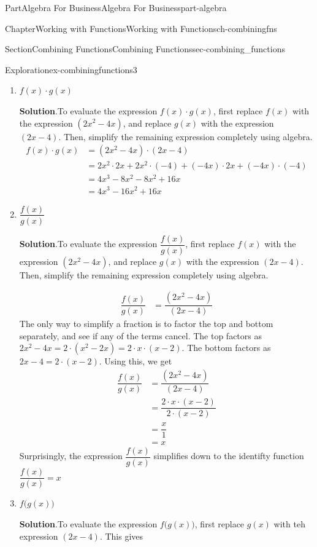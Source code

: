 \documentclass[oneside,10pt,]{tufte-book}
\newcommand{\blocktitlefont}{\relax}
\numberwithin{equation}{chapter}
\newcommand{\amp}{&}
\begin{document}
\begin{partptx}{Part}{Algebra For Business}{}{Algebra For Business}{}{}{part-algebra}
\begin{chapterptx}{Chapter}{Working with Functions}{}{Working with Functions}{}{}{ch-combiningfns}
\begin{sectionptx}{Section}{Combining Functions}{}{Combining Functions}{}{}{sec-combining_functions}
\begin{exploration}{Exploration}{}{ex-combiningfunctions3}
\begin{enumerate}[font=\bfseries,label=(\alph*),ref=\alph*]
\item{}\(f(x)\cdot g(x)\)%
\par\smallskip%
\noindent\textbf{\blocktitlefont Solution}.\hypertarget{ex-combiningfunctions3-4-2}{}\quad{}To evaluate the expression \(f(x)\cdot g(x)\), first replace \(f(x)\) with the expression \((2x^2-4x)\), and replace \(g(x)\) with the expression \((2x-4)\).  Then, simplify the remaining expression completely using algebra.%
\begin{align*}
f(x)\cdot g(x)\amp =(2x^2-4x) \cdot (2x-4)\\
\amp = 2x^2\cdot 2x + 2x^2 \cdot (-4) + (-4x)\cdot 2x + (-4x)\cdot (-4) \\
\amp = 4x^3 - 8x^2 - 8x^2 + 16x\\
\amp = 4x^3 - 16x^2 + 16x
\end{align*}
%
\item{}\(\dfrac{f(x)}{g(x)}\)%
\par\smallskip%
\noindent\textbf{\blocktitlefont Solution}.\hypertarget{ex-combiningfunctions3-5-2}{}\quad{}To evaluate the expression \(\dfrac{f(x)}{g(x)}\), first replace \(f(x)\) with the expression \((2x^2-4x)\), and replace \(g(x)\) with the expression \((2x-4)\).  Then, simplify the remaining expression completely using algebra.%
\par
%
\begin{align*}
\dfrac{f(x)}{g(x)} \amp = \dfrac{(2x^2-4x)}{(2x-4)} 
\end{align*}
The only way to simplify a fraction is to factor the top and bottom separately, and see if any of the terms cancel.  The top factors as \(2x^2-4x = 2\cdot(x^2-2x) = 2\cdot x\cdot (x-2)\).  The bottom factors as \(2x-4= 2 \cdot (x-2)\).  Using this, we get%
\begin{align*}
\dfrac{f(x)}{g(x)} \amp = \dfrac{(2x^2-4x)}{(2x-4)} \\
\amp = \dfrac{2\cdot x\cdot (x-2)}{2\cdot (x-2)}\\
\amp = \dfrac{x}{1}\\
\amp = x
\end{align*}
Surprisingly, the expression \(\dfrac{f(x)}{g(x)}\) simplifies down to the identifty function \(\dfrac{f(x)}{g(x)} = x\)%
\item{}\(f\Big(g(x)\Big)\)%
\par\smallskip%
\noindent\textbf{\blocktitlefont Solution}.\hypertarget{ex-combiningfunctions3-6-2}{}\quad{}To evaluate the expression \(f\Big(g(x)\Big)\), first replace \(g(x)\) with teh expression \((2x-4)\).  This gives%
\begin{equation*}

\end{equation*}
\end{enumerate}
\end{exploration}
\end{sectionptx}
\end{chapterptx}
\end{partptx}
\end{document}
